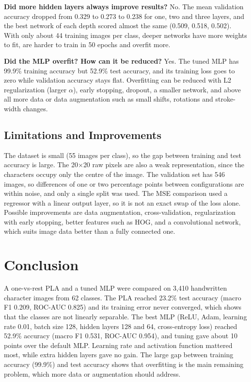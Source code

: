\documentclass[12pt,a4paper]{article}
\begin{document}
\textbf{Did more hidden layers always improve results?}
No. The mean validation accuracy dropped from 0.329 to 0.273 to 0.238 for one, two and three layers, and the best network of each depth scored almost the same (0.509, 0.518, 0.502). With only about 44 training images per class, deeper networks have more weights to fit, are harder to train in 50 epochs and overfit more.

\textbf{Did the MLP overfit? How can it be reduced?}
Yes. The tuned MLP has 99.9\% training accuracy but 52.9\% test accuracy, and its training loss goes to zero while validation accuracy stays flat. Overfitting can be reduced with L2 regularization (larger $\alpha$), early stopping, dropout, a smaller network, and above all more data or data augmentation such as small shifts, rotations and stroke-width changes.

\subsection{Limitations and Improvements}
The dataset is small (55 images per class), so the gap between training and test accuracy is large. The 20$\times$20 raw pixels are also a weak representation, since the characters occupy only the centre of the image. The validation set has 546 images, so differences of one or two percentage points between configurations are within noise, and only a single split was used. The MSE comparison used a regressor with a linear output layer, so it is not an exact swap of the loss alone. Possible improvements are data augmentation, cross-validation, regularization with early stopping, better features such as HOG, and a convolutional network, which suits image data better than a fully connected one.

\section{Conclusion}
A one-vs-rest PLA and a tuned MLP were compared on 3,410 handwritten character images from 62 classes. The PLA reached 23.2\% test accuracy (macro F1 0.209, ROC-AUC 0.825) and its training error never converged, which shows that the classes are not linearly separable. The best MLP (ReLU, Adam, learning rate 0.01, batch size 128, hidden layers 128 and 64, cross-entropy loss) reached 52.9\% accuracy (macro F1 0.531, ROC-AUC 0.954), and tuning gave about 10 points over the default MLP. Learning rate and activation function mattered most, while extra hidden layers gave no gain. The large gap between training accuracy (99.9\%) and test accuracy shows that overfitting is the main remaining problem, which more data or augmentation should address.
\end{document}
